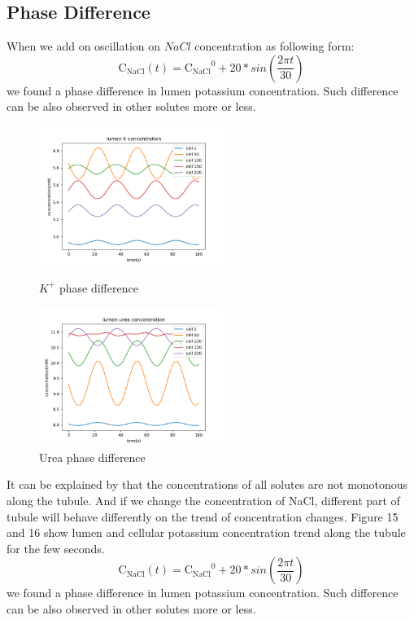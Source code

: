 \documentclass{article}
\begin{document}
\subsection{Phase Difference}
When we add on oscillation on $NaCl$ concentration as following form:
\begin{equation}
\mathrm{C_{NaCl}}(t)=\mathrm{C_{NaCl}}^{0}+20*sin(\frac{2\pi t}{30})
\end{equation} 
we found a phase difference in lumen potassium concentration. Such difference can be also observed in other solutes more or less.
\begin{figure}[H]
\centering
\begin{minipage}[t]{0.48\textwidth}
\centering
\includegraphics[width=6cm]{figure/figure13.png}
\caption{$K^{+}$ phase difference}
\end{minipage}
\begin{minipage}[t]{0.48\textwidth}
\centering
\includegraphics[width=6cm]{figure/figure14.png}
\caption{Urea phase difference}
\end{minipage}
\end{figure}
It can be explained by that the concentrations of all solutes are not monotonous along the tubule. And if we change the concentration of NaCl, different part of tubule will behave differently on the trend of concentration changes. Figure 15 and 16 show lumen and cellular potassium concentration trend along the tubule for the few seconds.
\begin{equation}
\mathrm{C_{NaCl}}(t)=\mathrm{C_{NaCl}}^{0}+20*sin(\frac{2\pi t}{30})
\end{equation} 
we found a phase difference in lumen potassium concentration. Such difference can be also observed in other solutes more or less.
\end{document}
